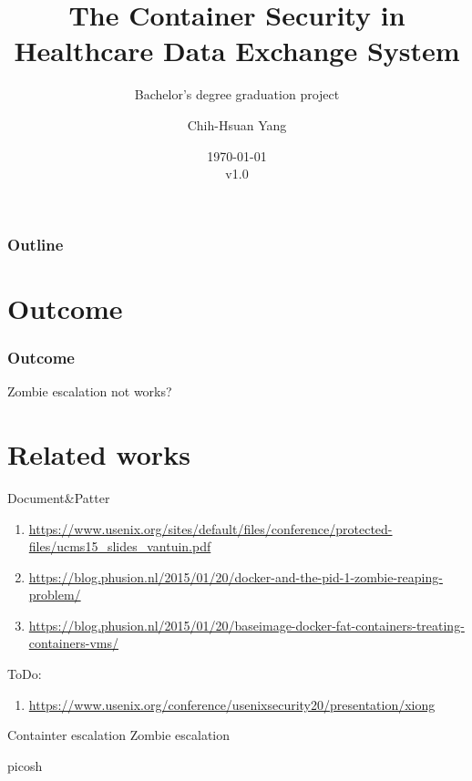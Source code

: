 \documentclass{beamer}
\title{The Container Security in Healthcare Data Exchange System}
\subtitle{Bachelor's degree graduation project}
\author{Chih-Hsuan Yang}
\institute{National Sun Yat-sen University}
\date{\today\\v1.0}
\begin{document}
\begin{CJK*}{UTF8}{bsmi}

    \begin{frame}
        \titlepage
    \end{frame}

    \begin{frame}
        \frametitle{Outline}
        \tableofcontents
    \end{frame}

    \section{Outcome}
    \begin{frame}
        \frametitle{Outcome}
        \centering \Large {Zombie escalation not works?}
    \end{frame}



    \section{Related works}
    \begin{frame}{Document\&Patter}
        \begin{enumerate}
            \item \url{https://www.usenix.org/sites/default/files/conference/protected-files/ucms15_slides_vantuin.pdf}
            \item \url{https://blog.phusion.nl/2015/01/20/docker-and-the-pid-1-zombie-reaping-problem/}
            \item \url{https://blog.phusion.nl/2015/01/20/baseimage-docker-fat-containers-treating-containers-vms/}
        \end{enumerate}


        ToDo:
        \begin{enumerate}
            \item\url{https://www.usenix.org/conference/usenixsecurity20/presentation/xiong}
        \end{enumerate}

    \end{frame}
    \begin{frame}{Containter escalation}
        \centering\Large{Zombie escalation}
    \end{frame}

    \begin{frame}{picosh}
        
    \end{frame}


\end{CJK*}
\end{document}
